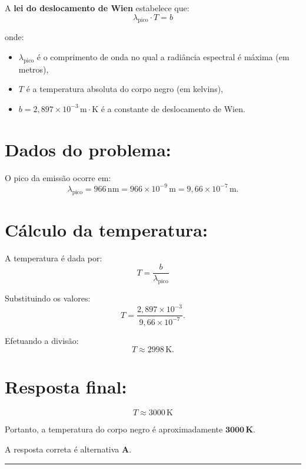 \begin{flushleft}
A \textbf{lei do deslocamento de Wien} estabelece que:
\[
\lambda_{\text{pico}} \cdot T = b
\]

onde:
\begin{itemize}
    \item \( \lambda_{\text{pico}} \) é o comprimento de onda no qual a radiância espectral é máxima (em metros),
    \item \( T \) é a temperatura absoluta do corpo negro (em kelvins),
    \item \( b = 2,897 \times 10^{-3} \, \mathrm{m\cdot K} \) é a constante de deslocamento de Wien.
\end{itemize}

\section*{Dados do problema:}

O pico da emissão ocorre em:
\[
\lambda_{\text{pico}} = 966 \, \mathrm{nm} = 966 \times 10^{-9} \, \mathrm{m} = 9,66 \times 10^{-7} \, \mathrm{m}.
\]

\section*{Cálculo da temperatura:}

A temperatura é dada por:
\[
T = \frac{b}{\lambda_{\text{pico}}}
\]

Substituindo os valores:
\[
T = \frac{2,897 \times 10^{-3}}{9,66 \times 10^{-7}}.
\]

Efetuando a divisão:
\[
T \approx 2998 \, \mathrm{K}.
\]

\section*{Resposta final:}

\[
\boxed{
T \approx 3000 \, \mathrm{K}
}
\]

Portanto, a temperatura do corpo negro é aproximadamente \( \mathbf{3000\,K} \).

A resposta correta é alternativa \colorbox{green!50}{\textbf{A}}.
\end{flushleft}

\noindent\rule{\linewidth}{0.6pt}\\

